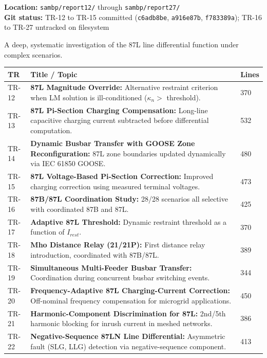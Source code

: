 \documentclass[11pt,a4paper]{article}
\begin{document}
\begin{phasebox}
\textbf{Location:} \texttt{sambp/report12/} through \texttt{sambp/report27/}\\
\textbf{Git status:} TR-12 to TR-15 committed (\texttt{c6adb8be}, \texttt{a916e87b},
\texttt{f783389a}); TR-16 to TR-27 untracked on filesystem
\end{phasebox}

A deep, systematic investigation of the 87L line differential function under
complex scenarios.

\begin{longtable}{lp{9.5cm}l}
\toprule
\textbf{TR} & \textbf{Title / Topic} & \textbf{Lines} \\
\midrule
\endhead
TR-12 & \textbf{87L Magnitude Override:} Alternative restraint criterion when LM solution is ill-conditioned ($\kappa_n > $ threshold). & 370 \\[3pt]
TR-13 & \textbf{87L Pi-Section Charging Compensation:} Long-line capacitive charging current subtracted before differential computation. & 532 \\[3pt]
TR-14 & \textbf{Dynamic Busbar Transfer with GOOSE Zone Reconfiguration:} 87L zone boundaries updated dynamically via IEC 61850 GOOSE. & 480 \\[3pt]
TR-15 & \textbf{87L Voltage-Based Pi-Section Correction:} Improved charging correction using measured terminal voltages. & 473 \\[3pt]
TR-16 & \textbf{87B/87L Coordination Study:} 28/28 scenarios all selective with coordinated 87B and 87L. & 425 \\[3pt]
TR-17 & \textbf{Adaptive 87L Threshold:} Dynamic restraint threshold as a function of $I_{rest}$. & 370 \\[3pt]
TR-18 & \textbf{Mho Distance Relay (21/21P):} First distance relay introduction, coordinated with 87B/87L. & 389 \\[3pt]
TR-19 & \textbf{Simultaneous Multi-Feeder Busbar Transfer:} Coordination during concurrent busbar switching events. & 344 \\[3pt]
TR-20 & \textbf{Frequency-Adaptive 87L Charging-Current Correction:} Off-nominal frequency compensation for microgrid applications. & 450 \\[3pt]
TR-21 & \textbf{Harmonic-Component Discrimination for 87L:} 2nd/5th harmonic blocking for inrush current in meshed networks. & 386 \\[3pt]
TR-22 & \textbf{Negative-Sequence 87LN Line Differential:} Asymmetric fault (SLG, LLG) detection via negative-sequence component. & 413 \\[3pt]

\end{longtable}
\end{document}
